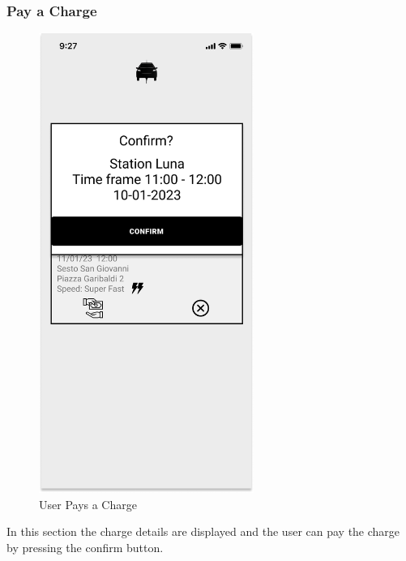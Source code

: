 \subsubsection{Pay a Charge}
\begin{figure}[H]
    \centering
    \includegraphics[keepaspectratio, height=15cm]{Mockup/UserAppInterface/Pay Charge.png}
    \caption{User Pays a Charge}
    \label{pop:Pay}
\end{figure}
In this section the charge details are displayed and the user can pay the charge by pressing the confirm button.
